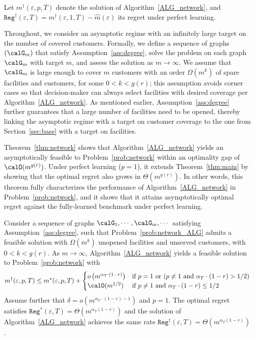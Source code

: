 \documentclass[blindrev]{informs3noheader}
\begin{document}
Let $m^\dagger(\varepsilon,p,T)$ denote the solution of Algorithm~\ref{ALG_network}, and $\texttt{Reg}^\dagger(\varepsilon, T)=m^\dagger(\varepsilon, 1,T)-\widehat{m}(\varepsilon)$ its regret under perfect learning.

Throughout, we consider an asymptotic regime with an infinitely large target on the number of covered customers. Formally, we define a sequence of graphs $(\calG_m)$ that satisfy Assumption~\ref{ass:degree}, solve the problem on each graph $\calG_m$ with target $m$, and assess the solution as $m\to\infty$. We assume that $\calG_m$ is large enough to cover $m$ customers with an order $\Omega(m^k)$ of spare facilities and customers, for some $0<k<g(r)$; this assumption avoids corner cases so that decision-maker can always select facilities with desired coverage per Algorithm~\ref{ALG_network}. As mentioned earlier, Assumption~\ref{ass:degree} further guarantees that a large number of facilities need to be opened, thereby linking the asymptotic regime with a target on customer coverage to the one from Section~\ref{sec:base} with a target on facilities.

Theorem~\ref{thm:network} shows that Algorithm~\ref{ALG_network} yields an asymptotically feasible to Problem~\eqref{prob:network} within an optimality gap of $\calO(m^{g(r)})$. Under perfect learning ($p=1$), it extends Theorem~\ref{thm:main} by showing that the optimal regret also grows in $\Theta(m^{g(r)})$. In other words, this theorem fully characterizes the performance of Algorithm~\ref{ALG_network} in Problem~\eqref{prob:network}, and it shows that it attains asymptotically optimal regret against the fully-learned benchmark under perfect learning.

\begin{theorem}\label{thm:network}
Consider a sequence of graphs $\calG_1,\cdots,\calG_m,\cdots$ satisfying Assumption~\ref{ass:degree}, such that Problem~\eqref{prob:network_ALG} admits a feasible solution with $\Omega(m^k)$ unopened facilities and unserved customers, with $0<k<g(r)$. As $m \to \infty$, Algorithm~\ref{ALG_network} yields a feasible solution to Problem~\eqref{prob:network} with
$$m^\dagger(\varepsilon, p,T)\leq m^*(\varepsilon, p,T)+\begin{cases}
    o\left(m^{\alpha_T \cdot (1-r)}\right)& \text{if }p=1 \text{ or } (p \neq 1 \text{ and } \alpha_T\cdot(1-r)>1/2)\\
    \calO(m^{1/2}) & \text{if }p \neq 1\text{ and } \alpha_T\cdot(1-r)\leq 1/2
\end{cases}$$
Assume further that $\delta = o\left(m^{\alpha_T\cdot(1-r)-1}\right)$ and $p=1$. The optimal regret satisfies $\texttt{Reg}^*(\varepsilon, T)=\Theta\left(m^{\alpha_T(1-r)}\right)$ and the solution of Algorithm~\ref{ALG_network} achieves the same rate $\texttt{Reg}^\dagger(\varepsilon, T)=\Theta\left(m^{\alpha_T(1-r)}\right)$.
\end{theorem}
\end{document}
